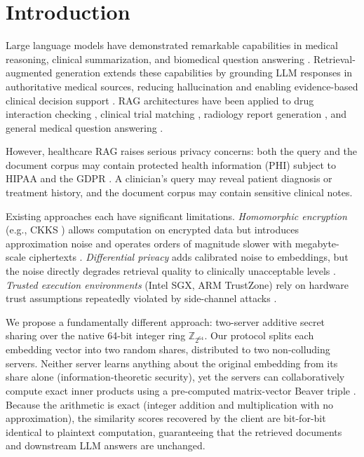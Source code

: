 \documentclass[conference]{IEEEtran}
\newcommand{\Z}{\mathbb{Z}}
\begin{document}
\section{Introduction}
\label{sec:intro}

Large language models have demonstrated remarkable capabilities in medical
reasoning, clinical summarization, and biomedical question answering
\cite{singhal2023medpalm, nori2023gpt4medicine}. Retrieval-augmented
generation extends these capabilities by grounding LLM responses in
authoritative medical sources, reducing hallucination and enabling
evidence-based clinical decision support
\cite{xiong2024benchmarking_medical_rag}. RAG architectures have been applied
to drug interaction checking \cite{zakka2024almanac}, clinical trial matching
\cite{jin2024trialmatch}, radiology report generation
\cite{jeong2024xrem}, and general medical question answering
\cite{xiong2024benchmarking_medical_rag}.

However, healthcare RAG raises serious privacy concerns: both the query
and the document corpus may contain protected health information (PHI)
subject to HIPAA \cite{hipaa1996} and the GDPR \cite{gdpr2016}. A
clinician's query may reveal patient diagnosis or treatment history, and
the document corpus may contain sensitive clinical notes.

Existing approaches each have significant limitations.
\emph{Homomorphic encryption} (e.g., CKKS \cite{cheon2017ckks}) allows
computation on encrypted data but introduces approximation noise and
operates orders of magnitude slower with megabyte-scale ciphertexts
\cite{zuber2021knn}.
\emph{Differential privacy} adds calibrated noise to embeddings, but
the noise directly degrades retrieval quality to clinically unacceptable
levels \cite{lyu2020dp}.
\emph{Trusted execution environments} (Intel SGX, ARM TrustZone) rely on
hardware trust assumptions repeatedly violated by side-channel attacks
\cite{nilsson2020sgx}.

We propose a fundamentally different approach: two-server additive secret
sharing over the native 64-bit integer ring $\Z_{2^{64}}$. Our protocol
splits each embedding vector into two random shares, distributed to two
non-colluding servers. Neither server learns anything about the original
embedding from its share alone (information-theoretic security), yet the
servers can collaboratively compute exact inner products using a pre-computed
matrix-vector Beaver triple \cite{beaver1991triples}. Because the arithmetic
is exact (integer addition and multiplication with no approximation), the
similarity scores recovered by the client are bit-for-bit identical to
plaintext computation, guaranteeing that the retrieved documents and
downstream LLM answers are unchanged.
\end{document}
